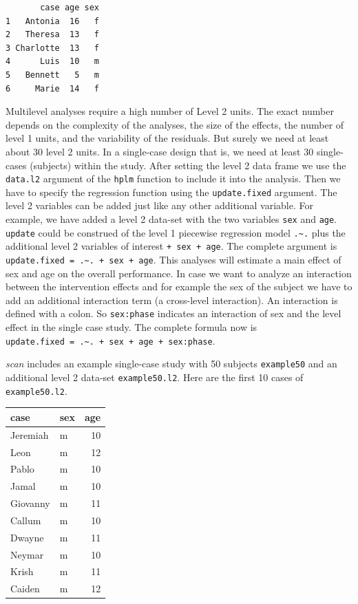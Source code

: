 \documentclass[
]{book}
\begin{document}
\begin{verbatim}
       case age sex
1   Antonia  16   f
2   Theresa  13   f
3 Charlotte  13   f
4      Luis  10   m
5   Bennett   5   m
6     Marie  14   f
\end{verbatim}

Multilevel analyses require a high number of Level 2 units. The exact number depends on the complexity of the analyses, the size of the effects, the number of level 1 units, and the variability of the residuals. But surely we need at least about 30 level 2 units. In a single-case design that is, we need at least 30 single-cases (subjects) within the study. After setting the level 2 data frame we use the \texttt{data.l2} argument of the \texttt{hplm} function to include it into the analysis. Then we have to specify the regression function using the \texttt{update.fixed} argument. The level 2 variables can be added just like any other additional variable. For example, we have added a level 2 data-set with the two variables \texttt{sex} and \texttt{age}. \texttt{update} could be construed of the level 1 piecewise regression model \texttt{.\textasciitilde{}.} plus the additional level 2 variables of interest \texttt{+\ sex\ +\ age}. The complete argument is \texttt{update.fixed\ =\ .\textasciitilde{}.\ +\ sex\ +\ age}. This analyses will estimate a main effect of sex and age on the overall performance. In case we want to analyze an interaction between the intervention effects and for example the sex of the subject we have to add an additional interaction term (a cross-level interaction). An interaction is defined with a colon. So \texttt{sex:phase} indicates an interaction of sex and the level effect in the single case study. The complete formula now is \texttt{update.fixed\ =\ .\textasciitilde{}.\ +\ sex\ +\ age\ +\ sex:phase}.

\emph{scan} includes an example single-case study with 50 subjects \texttt{example50} and an additional level 2 data-set \texttt{example50.l2}. Here are the first 10 cases of \texttt{example50.l2}.

\begin{tabular}{l|l|r}
\hline
case & sex & age\\
\hline
Jeremiah & m & 10\\
\hline
Leon & m & 12\\
\hline
Pablo & m & 10\\
\hline
Jamal & m & 10\\
\hline
Giovanny & m & 11\\
\hline
Callum & m & 10\\
\hline
Dwayne & m & 11\\
\hline
Neymar & m & 10\\
\hline
Krish & m & 11\\
\hline
Caiden & m & 12\\
\hline
\end{tabular}
\end{document}
